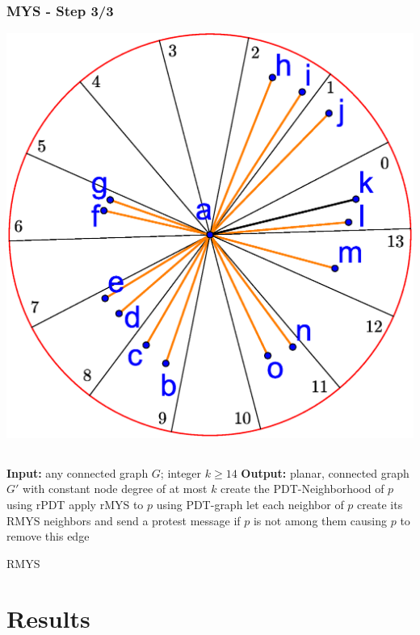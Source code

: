 \documentclass[compress]{beamer}
\begin{document}
\begin{frame} 
\frametitle{MYS - Step 3/3}
	\center \includegraphics[width=0.65\linewidth]{RMYS_3.eps}
\end{frame}

\subsection{}
\begin{frame}
\begin{algorithm}[H]
\begin{algorithmic}[0]
\STATE \textbf{Input:} any connected graph $G $; integer $k\geq 14 $
\STATE \textbf{Output:} planar, connected graph $G' $ with constant node degree of at most $k $
\STATE create the PDT-Neighborhood of $p $ using rPDT
\STATE apply rMYS to $p $ using PDT-graph
\STATE let each neighbor of $p $ create its RMYS neighbors and send a protest message if $p $ is not among them causing $p $ to remove this edge
\ENDFOR
\end{algorithmic}
\caption{RMYS}
\end{algorithm}
\end{frame}


\section{Results}
\end{document}
